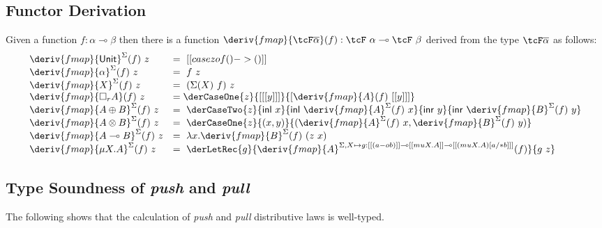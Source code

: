 \subsection{Functor Derivation}
\label{app:functor-derivation}

\begin{definition}
Given a function $f : \alpha \multimap \beta$ then
there is a function $\deriv{fmap}{\tcF \overline{\alpha}}(f)
: \tcF\ \alpha \multimap \tcF\ \beta$ derived from the type
$\tcF \overline{\alpha}$ as follows:
%
\begin{align*}
  \begin{array}{ll}
  \deriv{fmap}{\mathsf{Unit}}^\Sigma(f)\ z &= \ [[ case z of () -> () ]]\\
  \deriv{fmap}{\alpha}^\Sigma(f)\ z &= \ f\ z\\
  \deriv{fmap}{X}^\Sigma(f)\ z &= \ (\Sigma(X)\ f)\ z \\
  \deriv{fmap}{\Box_{r}A}(f)\ z &= \derCaseOne{z}{ [[ [y] ]] }{ [ \deriv{fmap}{A}(f)\  [[ y ]] ] } \\
  \deriv{fmap}{A \oplus B}^\Sigma(f)\ z &= \ \derCaseTwo{z}{\mathsf{inl}\
                                       x}{\mathsf{inl}\ \deriv{fmap}{A}^\Sigma(f)\ x}{\mathsf{inr}\ y}
                            {\mathsf{inr}\ \deriv{fmap}{B}^\Sigma(f)\ y}
\\
  \deriv{fmap}{A \otimes B}^\Sigma(f)\ z &= \ \derCaseOne{z}{(x, y)}
   {( \deriv{fmap}{A}^\Sigma(f)\ x, \deriv{fmap}{B}^\Sigma(f)\ y )} \\
  \deriv{fmap}{A \multimap B}^\Sigma(f)\ z &= \  \lambda x . \deriv{fmap}{B}^\Sigma(f)\ (z\ x) \\
  \deriv{fmap}{\mu X . A}^\Sigma(f)\ z &= \ \derLetRec{g}{\deriv{fmap}{A}^{\Sigma, X \mapsto
g : [[ (a -o b) ]] \multimap [[ {mu X . A} ]] \multimap [[ {{(mu X . A)} [ a /* b ]} ]] }(f)}{g\ z}
    \end{array}
\end{align*}
\end{definition}

\subsection{Type Soundness of \emph{push} and \emph{pull}}
\label{proof:deriving-type-soundness}
%
The following shows that the calculation of \emph{push}
and \emph{pull} distributive laws is well-typed.



